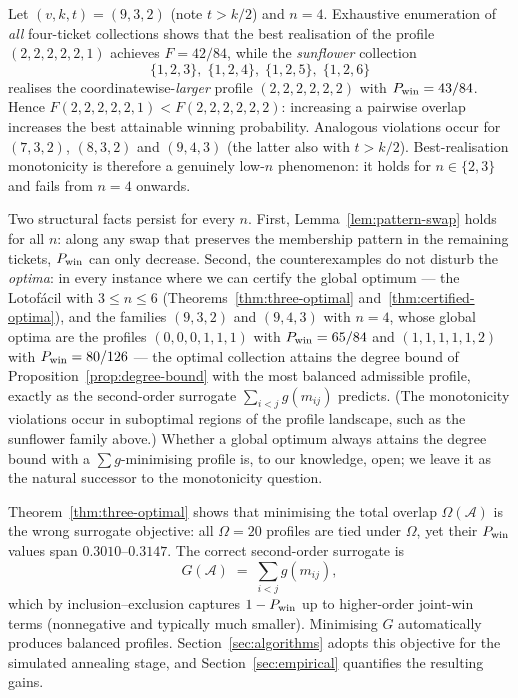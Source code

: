 \begin{example}[Profile monotonicity fails for $n = 4$]
  \label{ex:n4-counterexample}
  Let $(v,k,t) = (9,3,2)$ (note $t > k/2$) and $n = 4$.  Exhaustive
  enumeration of \emph{all} four-ticket collections shows that the best
  realisation of the profile $(2,2,2,2,2,1)$ achieves
  $F = 42/84$, while the \emph{sunflower} collection
  \[
    \{1,2,3\},\; \{1,2,4\},\; \{1,2,5\},\; \{1,2,6\}
  \]
  realises the coordinatewise-\emph{larger} profile $(2,2,2,2,2,2)$ with
  $P_{\mathrm{win}} = 43/84$.  Hence $F(2,2,2,2,2,1) < F(2,2,2,2,2,2)$: increasing a
  pairwise overlap increases the best attainable winning probability.
  Analogous violations occur for $(7,3,2)$, $(8,3,2)$ and $(9,4,3)$
  (the latter also with $t > k/2$).  Best-realisation monotonicity is
  therefore a genuinely low-$n$ phenomenon: it holds for $n \in \{2,3\}$
  and fails from $n = 4$ onwards.
\end{example}

\begin{remark}
  \label{rem:balance-principle}
  Two structural facts persist for every $n$.  First,
  Lemma~\ref{lem:pattern-swap} holds for all $n$: along any swap that
  preserves the membership pattern in the remaining tickets, $P_{\mathrm{win}}$ can
  only decrease.  Second, the counterexamples do not disturb the
  \emph{optima}: in every instance where we can certify the global
  optimum --- the Lotofácil with $3 \le n \le 6$
  (Theorems~\ref{thm:three-optimal} and~\ref{thm:certified-optima}), and the
  families $(9,3,2)$ and $(9,4,3)$ with $n = 4$, whose global optima are
  the profiles $(0,0,0,1,1,1)$ with $P_{\mathrm{win}} = 65/84$ and $(1,1,1,1,1,2)$
  with $P_{\mathrm{win}} = 80/126$ --- the optimal collection attains the degree bound of
  Proposition~\ref{prop:degree-bound} with the most balanced admissible
  profile, exactly as the second-order surrogate $\sum_{i<j} g(m_{ij})$
  predicts.  (The monotonicity violations occur in suboptimal regions of
  the profile landscape, such as the sunflower family above.)  Whether a
  global optimum always attains the degree bound with a
  $\sum g$-minimising profile is, to our knowledge, open; we leave it as
  the natural successor to the monotonicity question.
\end{remark}

\begin{remark}
  \label{rem:objective}
  Theorem~\ref{thm:three-optimal} shows that minimising the total overlap
  $\Omega(\mathcal{A})$ is the wrong surrogate objective: all
  $\Omega = 20$ profiles are tied under $\Omega$, yet their $P_{\mathrm{win}}$ values
  span $0.3010$--$0.3147$.  The correct second-order surrogate is
  \[
    G(\mathcal{A}) \;=\; \sum_{i<j} g(m_{ij}),
  \]
  which by inclusion--exclusion captures $1 - P_{\mathrm{win}}$ up to higher-order
  joint-win terms (nonnegative and typically much smaller).  Minimising
  $G$ automatically produces balanced profiles.
  Section~\ref{sec:algorithms} adopts this objective for the simulated
  annealing stage, and Section~\ref{sec:empirical} quantifies the
  resulting gains.
\end{remark}
